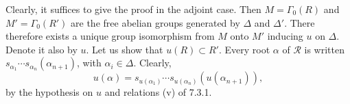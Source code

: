 Clearly, it suffices to give the proof in the adjoint case. Then $M=\Gamma_0(R)$ and $M'=\Gamma_0(R')$ are the free abelian groups generated by $\Delta$ and $\Delta'$. There therefore exists a unique group isomorphism from $M$ onto $M'$ inducing $u$ on $\Delta$. Denote it also by $u$. Let us show that $u(R)\subset R'$. Every root $\alpha$ of $\mathcal R$ is written $s_{\alpha_1}\cdots s_{\alpha_n}(\alpha_{n+1})$, with $\alpha_i\in\Delta$. Clearly,
\[
u(\alpha)=s_{u(\alpha_1)}\cdots s_{u(\alpha_n)}(u(\alpha_{n+1})),
\]
by the hypothesis on $u$ and relations (v) of 7.3.1.
